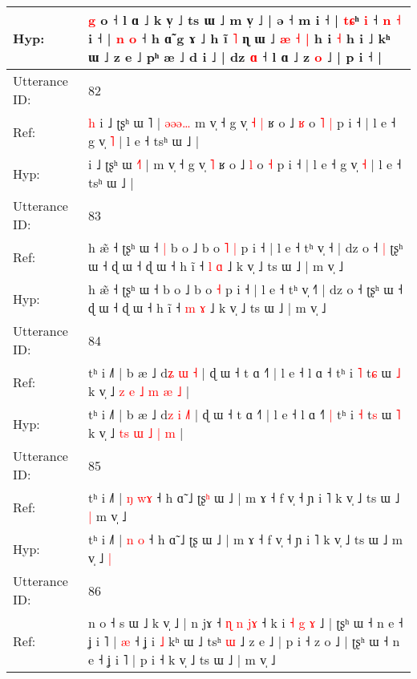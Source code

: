 \documentclass[10pt]{article}
\DeclareRobustCommand{\hl}[1]{{\textcolor{red}{#1}}}
\begin{document}
\begin{longtable}{ll}
 \\
Hyp: & \hl{}\hl{g} o ˧ l ɑ ˩ k v̩ ˩ ts ɯ ˩\hl{}\hl{} m v̩ ˩ | ə ˧ m i ˧ | \hl{t}\hl{ɕ}ʰ \hl{i} ˧\hl{ }\hl{n} \hl{˧} i ˧ | \hl{n} \hl{}\hl{o} ˧ h ɑ̃\hl{}\hl{}\hl{}\hl{}\hl{}\hl{}\hl{}\hl{} g ɤ ˩\hl{}\hl{} h ĩ \hl{˥} ɳ ɯ ˩ \hl{æ} \hl{˧} \hl{|} h i \hl{˧} h i ˩ kʰ ɯ ˩ z e ˩ pʰ æ ˩ d i ˩ | dz \hl{ɑ} ˧ l ɑ ˩ z \hl{o} ˩ | p i ˧ |
 \\
\midrule
Utterance ID: & 82 \\
Ref: & \hl{h}\hl{ }i ˩ ʈʂʰ ɯ \hl{}˥ |\hl{ }\hl{ə}\hl{ə}\hl{ə}\hl{…} m v̩ ˧ g v̩\hl{ }\hl{˧} \hl{|} ʁ o ˩ \hl{ʁ} o\hl{ }\hl{˥} \hl{|} p i ˧ | l e ˧ g v̩ \hl{˥} | l e ˧ tsʰ ɯ ˩ |
 \\
Hyp: & \hl{}\hl{}i ˩ ʈʂʰ ɯ \hl{˧}˥ |\hl{}\hl{}\hl{}\hl{}\hl{} m v̩ ˧ g v̩\hl{}\hl{} \hl{˥} ʁ o ˩ \hl{l} o\hl{}\hl{} \hl{˧} p i ˧ | l e ˧ g v̩ \hl{˧} | l e ˧ tsʰ ɯ ˩ |
 \\
\midrule
Utterance ID: & 83 \\
Ref: & h æ̃ ˧ ʈʂʰ ɯ ˧\hl{ }\hl{|} b o ˩ b o\hl{ }\hl{˥} \hl{|} p i ˧ | l e ˧ tʰ v̩ ˧\hl{} | dz o ˧\hl{ }\hl{|} ʈʂʰ ɯ ˧ ɖ ɯ ˧ ɖ ɯ ˧ h ĩ ˧ \hl{l} \hl{ɑ} ˩ k v̩ ˩ ts ɯ ˩ | m v̩ ˩
 \\
Hyp: & h æ̃ ˧ ʈʂʰ ɯ ˧\hl{}\hl{} b o ˩ b o\hl{}\hl{} \hl{˧} p i ˧ | l e ˧ tʰ v̩ ˧\hl{˥} | dz o ˧\hl{}\hl{} ʈʂʰ ɯ ˧ ɖ ɯ ˧ ɖ ɯ ˧ h ĩ ˧ \hl{m} \hl{ɤ} ˩ k v̩ ˩ ts ɯ ˩ | m v̩ ˩
 \\
\midrule
Utterance ID: & 84 \\
Ref: & tʰ i ˩˥ | b æ ˩ d\hl{ʑ} \hl{ɯ} \hl{}\hl{˧} | ɖ ɯ ˧ t ɑ ˧˥ | l e ˧ l ɑ ˧\hl{}\hl{}\hl{} tʰ i \hl{˥} t\hl{ɕ} ɯ \hl{˩} k v̩ ˩ \hl{z}\hl{ }\hl{e} \hl{˩} \hl{m} \hl{æ} \hl{˩} |
 \\
Hyp: & tʰ i ˩˥ | b æ ˩ d\hl{z} \hl{i} \hl{˩}\hl{˥} | ɖ ɯ ˧ t ɑ ˧˥ | l e ˧ l ɑ ˧\hl{˥}\hl{ }\hl{|} tʰ i \hl{˧} t\hl{s} ɯ \hl{˥} k v̩ ˩ \hl{}\hl{t}\hl{s} \hl{ɯ} \hl{˩} \hl{|} \hl{m} |
 \\
\midrule
Utterance ID: & 85 \\
Ref: & tʰ i ˩˥ | \hl{ŋ} \hl{w}\hl{ɤ} ˧ h ɑ̃ ˩ ʈʂ\hl{ʰ} ɯ ˩ | m ɤ ˧ f v̩ ˧ ɲ i ˥ k v̩ ˩ ts ɯ ˩\hl{ }\hl{|} m v̩ ˩\hl{}\hl{}
 \\
Hyp: & tʰ i ˩˥ | \hl{n} \hl{}\hl{o} ˧ h ɑ̃ ˩ ʈʂ\hl{} ɯ ˩ | m ɤ ˧ f v̩ ˧ ɲ i ˥ k v̩ ˩ ts ɯ ˩\hl{}\hl{} m v̩ ˩\hl{ }\hl{|}
 \\
\midrule
Utterance ID: & 86 \\
Ref: & n o ˧ s ɯ ˩ k v̩ ˩ | n jɤ ˧\hl{}\hl{}\hl{}\hl{} \hl{ɳ} \hl{n} \hl{}\hl{j}\hl{ɤ} ˧ k i \hl{˧} \hl{g} \hl{ɤ} ˩ | ʈʂʰ ɯ ˧ n e ˧ ʝ i ˥ | \hl{æ} ˧ ʝ i \hl{˩} kʰ ɯ ˩ tsʰ \hl{ɯ} ˩ z e ˩ | p i ˧ z o ˩ | ʈʂʰ ɯ ˧ n e ˧ ʝ i ˥ | p i ˧ k v̩ ˩ ts ɯ ˩ | m v̩ ˩

\end{longtable}
\end{document}
